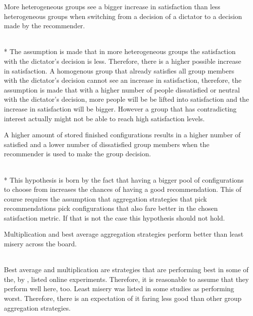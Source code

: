 \begin{hypothesis}
    \begin{itshape}
        \label{hyp:Evaluation:HeterogenousBiggerSatisfactionIncrease} More heterogeneous groups see a bigger increase in satisfaction than less heterogeneous groups when switching from a decision of a dictator to a decision made by the recommender.
    \end{itshape} \medskip \\*
    The assumption is made that in more heterogeneous groups the satisfaction with the dictator's decision is less. Therefore, there is a higher possible increase in satisfaction. A homogenous group that already satisfies all group members with the dictator's decision cannot see an increase in satisfaction, therefore, the assumption is made that with a higher number of people dissatisfied or neutral with the dictator's decision, more people will be be lifted into satisfaction and the increase in satisfaction will be bigger. However a group that has contradicting interest actually might not be able to reach high satisfaction levels.
\end{hypothesis}

\begin{hypothesis}
    \begin{itshape}
        \label{hyp:Evaluation:StoreSizeBetterResults} A higher amount of stored finished configurations results in a higher number of satisfied and a lower number of dissatisfied group members when the recommender is used to make the group decision.
    \end{itshape} \medskip \\*
    This hypothesis is born by the fact that having a bigger pool of configurations to choose from increases the chances of having a good recommendation. This of course requires the assumption that aggregation strategies that pick recommendations pick configurations that also fare better in the chosen satisfaction metric. If that is not the case this hypothesis should not hold.
\end{hypothesis}

\begin{hypothesis}
    \begin{itshape}
        \label{hyp:Evaluation:AggregationStrategies} Multiplication and best average aggregation strategies perform better than least misery across the board.
    \end{itshape} \medskip \\
    Best average and multiplication are strategies that are performing best in some of the, by \citeauthor{Masthoff2015} \cite[~ 755f]{Masthoff2015}, listed online experiments. Therefore, it is reasonable to assume that they perform well here, too. Least misery was listed in some studies as performing worst. Therefore, there is an expectation of it faring less good than other group aggregation strategies.
\end{hypothesis}

